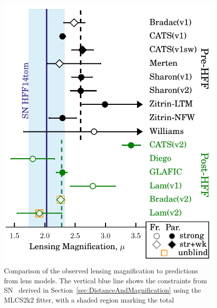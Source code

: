 

\begin{figure}
\begin{center}
\includegraphics[width=\columnwidth]{FIG/snTomas_magnifications}
\caption{ 
Comparison of the observed lensing magnification to predictions from
lens models. The vertical blue line shows the constraints from
SN \tomas\ derived in Section~\ref{sec:DistanceAndMagnification} using
the MLCS2k2 fitter, with a shaded region marking the total
}
\end{center}
\end{figure}
